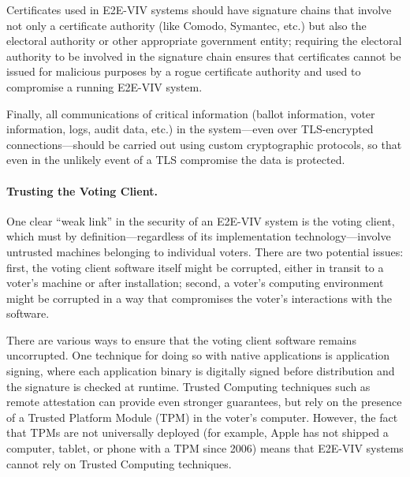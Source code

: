 Certificates used in E2E-VIV systems should have signature chains that
involve not only a certificate authority (like Comodo, Symantec, etc.)
but also the electoral authority or other appropriate government
entity; requiring the electoral authority to be involved in the
signature chain ensures that certificates cannot be issued for
malicious purposes by a rogue certificate authority and used to
compromise a running E2E-VIV system.

Finally, all communications of critical information (ballot
information, voter information, logs, audit data, etc.) in the
system---even over TLS-encrypted connections---should be carried out
using custom cryptographic protocols, so that even in the unlikely
event of a TLS compromise the data is protected.

\paragraph{Trusting the Voting Client.} One clear ``weak link'' in the
security of an E2E-VIV system is the voting client, which must by
definition---regardless of its implementation technology---involve
untrusted machines belonging to individual voters. There are two
potential issues: first, the voting client software itself might be
corrupted, either in transit to a voter's machine or after
installation; second, a voter's computing environment might be
corrupted in a way that compromises the voter's interactions with the
software.

There are various ways to ensure that the voting client software
remains uncorrupted. One technique for doing so with native
applications is application signing, where each application binary is
digitally signed before distribution and the signature is checked at
runtime. Trusted Computing techniques such as remote attestation can
provide even stronger guarantees, but rely on the presence of a
Trusted Platform Module (TPM) in the voter's computer.  However, the
fact that TPMs are not universally deployed (for example, Apple has
not shipped a computer, tablet, or phone with a TPM since 2006) means
that E2E-VIV systems cannot rely on Trusted Computing techniques.


